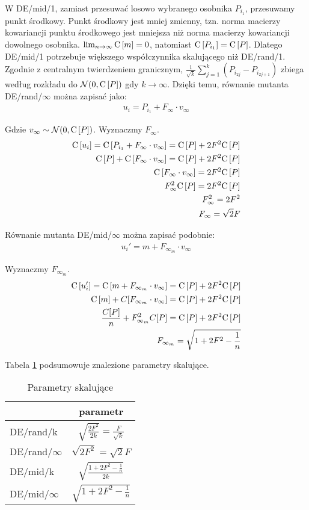 \documentclass[12pt, a4paper]{article}
\def\C{{\rm C}\,}
\begin{document}
W DE/mid/1, zamiast przesuwać losowo wybranego osobnika $P_{i_1}$, przesuwamy punkt środkowy.
Punkt środkowy jest mniej zmienny, 
tzn. norma macierzy kowariancji punktu środkowego jest mniejsza niż norma macierzy kowariancji dowolnego osobnika.
$\lim_{n\to\infty} \C[m] = 0$, natomiast $\C[P_{i_1}] = \C[P]$.
Dlatego DE/mid/1 potrzebuje większego współczynnika skalującego niż DE/rand/1. \\

Zgodnie z centralnym twierdzeniem granicznym, $\frac{1}{{\sqrt{k}}}\sum\limits_{j=1}^k (P_{i_{2j}} - P_{i_{2j+1}})$ 
zbiega według rozkładu do $\mathcal{N}(0, \C[P])$ gdy $k \to \infty$. 
Dzięki temu, równanie mutanta DE/rand/$\infty$ można zapisać jako:
\begin{align*}
u_i = P_{i_1} + F_\infty \cdot v_\infty
\end{align*}

Gdzie $v_\infty \sim \mathcal{N}(0, \C[P])$. Wyznaczmy $F_\infty$.
\begin{align*}
\C[u_i] = \C[P_{i_1} + F_\infty \cdot v_\infty] = \C[P] + 2F^2\C[P] \\
\C[P] + \C[F_\infty \cdot v_\infty] = \C[P] + 2F^2\C[P] \\
\C[F_\infty \cdot v_\infty] = 2F^2\C[P] \\
F_\infty^2 \C[P] = 2F^2\C[P] \\
F_\infty^2 = 2F^2 \\
F_\infty = \sqrt{2}F
\end{align*}

Równanie mutanta DE/mid/$\infty$ można zapisać podobnie:
\begin{align*}
u_i' = m + F_{\infty_m} \cdot v_\infty
\end{align*}

Wyznaczmy $F_{\infty_m}$.
\begin{align*}
\C[u_i'] = \C[m + F_{\infty_m} \cdot v_\infty] = \C[P] + 2F^2\C[P] \\
\C[m] + C[F_{\infty_m} \cdot v_\infty] = \C[P] + 2F^2\C[P] \\
\frac{C[P]}{n} + F_{\infty_m}^2 C[P] = \C[P] + 2F^2\C[P] \\
F_{\infty_m} = \sqrt{1 + 2F^2 - \frac{1}{n}}
\end{align*}

Tabela \ref{table:parametry} podsumowuje znalezione parametry skalujące.

\begin{table}[H]
\centering
\begin{tabular}{ l | c }
                 & parametr \\ \hline
DE/rand/k        & $\sqrt{\frac{2F^2}{2k}} = \frac{F}{\sqrt{k}}$ \\ 
DE/rand/$\infty$ & $\sqrt{2F^2} = \sqrt{2}F$ \\ 
DE/mid/k         & $\sqrt{\frac{1 + 2F^2 - \frac{1}{n}}{2k}}$ \\
DE/mid/$\infty$  & $\sqrt{1 + 2F^2 - \frac{1}{n}}$ \\
\end{tabular}
\caption{Parametry skalujące}
\label{table:parametry}
\end{table}
\end{document}
